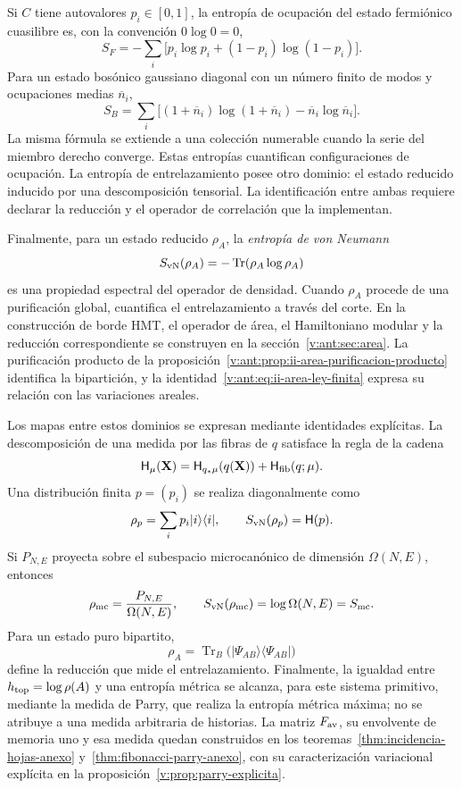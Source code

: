 Si \(C\) tiene autovalores \(p_i\in[0,1]\), la entropía de ocupación del
estado fermiónico cuasilibre es, con la convención \(0\log0=0\),
\begin{equation}
 S_F=-\sum_i\bigl[p_i\log p_i+(1-p_i)\log(1-p_i)\bigr].
 \label{v:rec:eq:entropia-cuasilibre-fermi-rev3}
\end{equation}
Para un estado bosónico gaussiano diagonal con un número finito de modos y
ocupaciones medias \(\overline n_i\),
\begin{equation}
 S_B=\sum_i\bigl[(1+\overline n_i)\log(1+\overline n_i)
                  -\overline n_i\log\overline n_i\bigr].
 \label{v:rec:eq:entropia-gaussiana-bose-rev3}
\end{equation}
La misma fórmula se extiende a una colección numerable cuando la serie del
miembro derecho converge.
Estas entropías cuantifican configuraciones de ocupación. La entropía de
entrelazamiento posee otro dominio: el estado reducido inducido por una
descomposición tensorial. La identificación entre ambas requiere declarar la
reducción y el operador de correlación que la implementan.

Finalmente, para un estado reducido \(\rho_A\), la \emph{entropía de von
Neumann}
\[
 S_{\rm vN}(\rho_A)=-\operatorname{Tr}(\rho_A\log\rho_A)
\]
es una propiedad espectral del operador de densidad. Cuando \(\rho_A\)
procede de una purificación global, cuantifica el entrelazamiento a través
del corte. En la construcción de borde HMT, el operador de área, el
Hamiltoniano modular y la reducción correspondiente se construyen en la
sección~\ref{v:ant:sec:area}. La purificación producto de la
proposición~\ref{v:ant:prop:ii-area-purificacion-producto} identifica
la bipartición, y la identidad~\eqref{v:ant:eq:ii-area-ley-finita}
expresa su relación con las variaciones areales.

Los mapas entre estos dominios se expresan mediante identidades explícitas.
La descomposición de una medida por las fibras de \(q\) satisface la regla de
la cadena
\begin{equation}
 \mathsf H_\mu(\mathbf X)
 =\mathsf H_{q_*\mu}(q(\mathbf X))
  +\mathsf H_{\rm fib}(q;\mu).
 \label{v:rec:eq:cadena-entropia-fibras-rev2}
\end{equation}
Una distribución finita \(p=(p_i)\) se realiza diagonalmente como
\[
 \rho_p=\sum_i p_i|i\rangle\langle i|,
 \qquad S_{\rm vN}(\rho_p)=\mathsf H(p).
\]
Si \(P_{N,E}\) proyecta sobre el subespacio microcanónico de dimensión
\(\Omega(N,E)\), entonces
\[
 \rho_{\rm mc}=\frac{P_{N,E}}{\Omega(N,E)},
 \qquad S_{\rm vN}(\rho_{\rm mc})=\log\Omega(N,E)=S_{\rm mc}.
\]
Para un estado puro bipartito,
\[
 \rho_A=\operatorname{Tr}_B
 \bigl(|\Psi_{AB}\rangle\langle\Psi_{AB}|\bigr)
\]
define la reducción que mide el entrelazamiento. Finalmente, la igualdad entre
\(h_{\rm top}=\log\rho(A)\) y una entropía métrica se alcanza, para este
sistema primitivo, mediante la medida de Parry, que realiza la entropía métrica
máxima; no se atribuye a una medida arbitraria de historias. La matriz
\(F_{\rm av}\), su envolvente de memoria uno y esa medida quedan
construidos en los teoremas~\ref{thm:incidencia-hojas-anexo}
y~\ref{thm:fibonacci-parry-anexo}, con su caracterización variacional
explícita en la proposición~\ref{v:prop:parry-explicita}.
